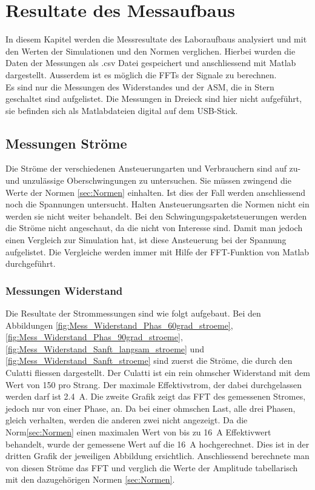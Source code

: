 \section{Resultate des Messaufbaus}
In diesem Kapitel werden die Messresultate des Laboraufbaus analysiert und mit den Werten der Simulationen und den Normen verglichen. Hierbei wurden die Daten der Messungen als .csv Datei gespeichert und anschliessend mit Matlab dargestellt. Ausserdem ist es möglich die FFTs der Signale zu berechnen.\\
Es sind nur die Messungen des Widerstandes und der ASM, die in Stern geschaltet sind aufgelistet. Die Messungen in Dreieck sind hier nicht aufgeführt, sie  befinden sich als Matlabdateien digital auf dem USB-Stick. 

\subsection{Messungen Ströme}
Die Ströme der verschiedenen Ansteuerungarten und Verbrauchern sind auf zu- und unzulässige Oberschwingungen zu untersuchen. Sie müssen zwingend die Werte der Normen \ref{sec:Normen} einhalten. Ist dies der Fall werden anschliessend noch die Spannungen untersucht. Halten Ansteuerungsarten die Normen nicht ein werden sie nicht weiter behandelt. Bei den Schwingungspaketsteuerungen werden die Ströme nicht angeschaut, da die nicht von Interesse sind. Damit man jedoch einen Vergleich zur Simulation hat, ist diese Ansteuerung bei der Spannung aufgelistet. Die Vergleiche werden immer mit Hilfe der FFT-Funktion von Matlab durchgeführt. 

\subsubsection{Messungen Widerstand}

Die Resultate der Strommessungen sind wie folgt aufgebaut. Bei den Abbildungen \ref{fig:Mess_Widerstand_Phas_60grad_stroeme}, \ref{fig:Mess_Widerstand_Phas_90grad_stroeme}, \ref{fig:Mess_Widerstand_Sanft_langsam_stroeme} und \ref{fig:Mess_Widerstand_Sanft_stroeme} sind zuerst die Ströme, die durch den Culatti fliessen dargestellt. Der Culatti ist ein rein ohmscher Widerstand mit dem Wert von \SI{150}{\Omega} pro Strang. Der maximale Effektivstrom, der dabei durchgelassen werden darf ist \SI{2.4}{A}. Die zweite Grafik zeigt das FFT des gemessenen Stromes, jedoch nur von einer Phase, an. Da bei einer ohmschen Last, alle drei Phasen, gleich verhalten, werden die anderen zwei nicht angezeigt. Da die Norm\ref{sec:Normen} einen maximalen Wert von bis zu \SI{16}{A} Effektivwert behandelt, wurde der gemessene Wert auf die \SI{16}{A} hochgerechnet. Dies ist in der dritten Grafik der jeweiligen Abbildung ersichtlich. Anschliessend berechnete man von diesen Ströme das FFT und verglich die Werte der Amplitude tabellarisch mit den dazugehörigen Normen \ref{sec:Normen}.

